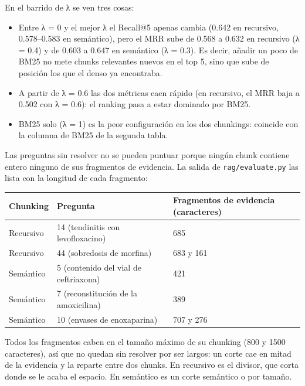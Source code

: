 En el barrido de λ se ven tres cosas:

\begin{itemize}
\tightlist
\item
  Entre λ = 0 y el mejor λ el Recall@5 apenas cambia (0.642 en recursivo, 0.578--0.583 en
  semántico), pero el MRR sube de 0.568 a 0.632 en recursivo (λ = 0.4) y de 0.603 a 0.647 en
  semántico (λ = 0.3). Es decir, añadir un poco de BM25 no mete chunks relevantes nuevos en el
  top 5, sino que sube de posición los que el denso ya encontraba.
\item
  A partir de λ = 0.6 las dos métricas caen rápido (en recursivo, el MRR baja a 0.502 con
  λ = 0.6): el ranking pasa a estar dominado por BM25.
\item
  BM25 solo (λ = 1) es la peor configuración en los dos chunkings: coincide con la columna de
  BM25 de la segunda tabla.
\end{itemize}

Las preguntas sin resolver no se pueden puntuar porque ningún chunk contiene entero ninguno de
sus fragmentos de evidencia. La salida de \texttt{rag/\allowbreak{}evaluate.py} las lista con la longitud de cada
fragmento:

{\def\LTcaptype{none} %
\small\setlength{\tabcolsep}{3pt}
\begin{longtable}[]{@{}lll@{}}
\toprule\noalign{}
Chunking & Pregunta & Fragmentos de evidencia (caracteres) \\
\midrule\noalign{}
\endhead
\bottomrule\noalign{}
\endlastfoot
Recursivo & 14 (tendinitis con levofloxacino) & 685 \\
Recursivo & 44 (sobredosis de morfina) & 683 y 161 \\
Semántico & 5 (contenido del vial de ceftriaxona) & 421 \\
Semántico & 7 (reconstitución de la amoxicilina) & 389 \\
Semántico & 10 (envases de enoxaparina) & 707 y 276 \\
\end{longtable}
}

Todos los fragmentos caben en el tamaño máximo de su chunking (800 y 1500 caracteres), así que
no quedan sin resolver por ser largos: un corte cae en mitad de la evidencia y la reparte entre
dos chunks. En recursivo es el divisor, que corta donde se le acaba el espacio. En semántico es
un corte semántico o por tamaño.

